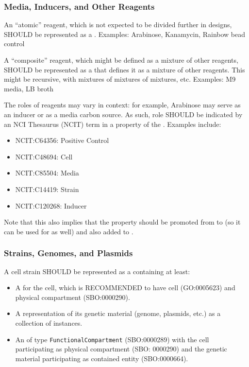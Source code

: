 \subsubsection{Media, Inducers, and Other Reagents}

An ``atomic'' reagent, which is not expected to be divided further in designs, SHOULD be represented as a \linebreak {}. Examples: Arabinose, Kanamycin, Rainbow bead control

A ``composite'' reagent, which might be defined as a mixture of other reagents, SHOULD be represented as a  that defines it as a mixture of other reagents. This might be recursive, with mixtures of mixtures of mixtures, etc. Examples: M9 media, LB broth

The roles of reagents may vary in context: for example, Arabinose may serve as an inducer or as a media carbon source. As such, role SHOULD be indicated by an NCI Thesaurus (NCIT) term in a  property of the . Examples include:
\begin{itemize}
\item NCIT:C64356: Positive Control
\item NCIT:C48694: Cell
\item NCIT:C85504: Media
\item NCIT:C14419: Strain
\item NCIT:C120268: Inducer
\end{itemize}

Note that this also implies that the  property should be promoted from  to  (so it can be used for  as well) and also added to .

\subsubsection{Strains, Genomes, and Plasmids}

A cell strain SHOULD be represented as a  containing at least:
\begin{itemize}
\item A  for the cell, which is RECOMMENDED to have  cell (GO:0005623) and  physical compartment (SBO:0000290).
\item A representation of its genetic material (genome, plasmids, etc.) as a collection of  instances.
\item An  of type \texttt{FunctionalCompartment} (SBO:0000289) with the cell participating as physical compartment (SBO: 0000290) and the genetic material participating as contained entity (SBO:0000664).
\end{itemize}

